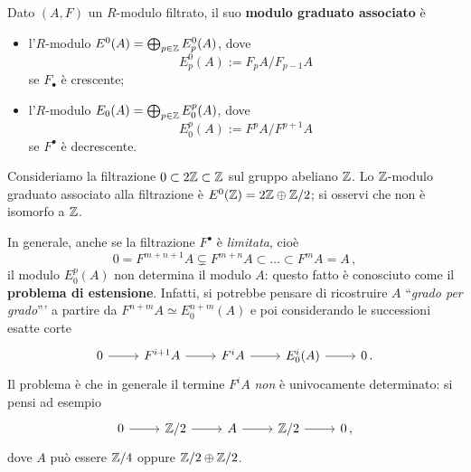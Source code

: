 \begin{df}
	Dato $(A,F)$ un $R$-modulo filtrato, il suo \textbf{modulo graduato associato} è
	\begin{itemize}
		\item l'$R$-modulo $E^{0}(A) = \bigoplus_{p \in {\mathbb Z}} E^{0}_{p}(A)$, 
		dove $$E^{0}_{p}(A) := F_{p}A/F_{p-1}A$$ se $F_{\bullet}$ è crescente;
		
		\item l'$R$-modulo $E_{0}(A) = \bigoplus_{p \in {\mathbb Z}} E_{0}^{p}(A)$, 
		dove $$E^{p}_{0}(A) := F^{p}A/F^{p+1}A$$ se $F^{\bullet}$ è decrescente.
	\end{itemize}
\end{df}

\begin{ex}
	Consideriamo la filtrazione $0 \subset 2{\mathbb Z} \subset {\mathbb Z}$ sul gruppo abeliano ${\mathbb Z}$.
	Lo ${\mathbb Z}$-modulo graduato associato alla filtrazione è $E^{0}({\mathbb Z})=2{\mathbb Z} \oplus {\mathbb Z}/2$;
	si osservi che non è isomorfo a ${\mathbb Z}$.
\end{ex}

\begin{oss}
	In generale, anche se la filtrazione $F^{\bullet}$ è \emph{limitata}, cioè
	\begin{equation*}
		0 = F^{m+n+1}A \subsetneq F^{m+n}A \subset \dots \subset F^{m}A = A\,,
	\end{equation*}
	il modulo $E^{p}_{0}(A)$ non determina il modulo $A$: 
	questo fatto è conosciuto come il \textbf{problema di estensione}.
	Infatti, si potrebbe pensare
	di ricostruire $A$ ``\emph{grado per grado}'''
	a partire da $F^{n+m}A \simeq E^{n+m}_{0}(A)$ e poi considerando
	le successioni esatte corte
	\begin{equation*}
		\begin{tikzcd}
			0 \ar[r]
			& F^{i+1}A \ar[r]
			& F^{i}A \ar[r]
			& E^{i}_{0}(A) \ar[r]
			& 0\,.
		\end{tikzcd}
	\end{equation*}
	Il problema è che in generale il termine 
	$F^{i}A$ \emph{non} è univocamente determinato:
	si pensi ad esempio
	\begin{equation*}
		\begin{tikzcd}
			0 \ar[r] & \Z/2 \ar[r] & A \ar[r] & \Z/2 \ar[r] & 0\,,
		\end{tikzcd}
	\end{equation*}
	dove $A$ può essere ${\mathbb Z}/4$ oppure ${\mathbb Z}/2 \oplus {\mathbb Z}/2$.
\end{oss}


